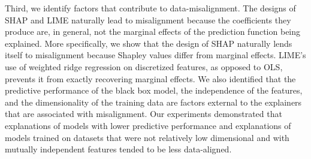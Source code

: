 \documentclass[12pt]{article}  %
\begin{document}
Third, we identify factors that contribute to data-misalignment. The designs of SHAP and LIME naturally lead to misalignment because the coefficients they produce are, in general, not the marginal effects of the prediction function being explained. More specifically, we show that the design of SHAP naturally lends itself to misalignment because Shapley values differ from marginal effects. LIME's use of weighted ridge regression on discretized features, as opposed to OLS, prevents it from exactly recovering marginal effects. We also identified that the predictive performance of the black box model, the independence of the features, and the dimensionality of the training data are factors external to the explainers that are associated with misalignment. Our experiments demonstrated that explanations of models with lower predictive performance and explanations of models trained on datasets that were not relatively low dimensional and with mutually independent features tended to be less data-aligned. %
 
\end{document}
